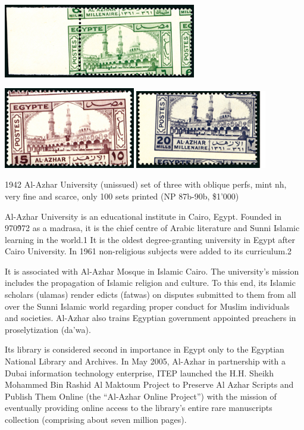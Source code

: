 \documentclass[justified]{tufte-book}
\begin{document}
\bigskip
\begin{center}
\includegraphics[width=0.63\textwidth]{./graphics/EG/al-azhar-6mils-oblique} 
\medskip

\includegraphics[width=0.43\textwidth]{./graphics/EG/al-azhar-15mils-oblique} \includegraphics[width=0.43\textwidth]{./graphics/EG/al-azhar-20mills-oblique} 
\end{center}

1942 Al-Azhar University (unissued) set of three with oblique perfs, mint nh, very fine and scarce, only 100 sets printed (NP 87b-90b, \$1'000)

Al-Azhar University is an educational institute in Cairo, Egypt. Founded in 970\~972 as a madrasa, it is the chief centre of Arabic literature and Sunni Islamic learning in the world.1 It is the oldest degree-granting university in Egypt after Cairo University. In 1961 non-religious subjects were added to its curriculum.2

It is associated with Al-Azhar Mosque in Islamic Cairo. The university's mission includes the propagation of Islamic religion and culture. To this end, its Islamic scholars (ulamas) render edicts (fatwas) on disputes submitted to them from all over the Sunni Islamic world regarding proper conduct for Muslim individuals and societies. Al-Azhar also trains Egyptian government appointed preachers in proselytization (da'wa).

Its library is considered second in importance in Egypt only to the Egyptian National Library and Archives. In May 2005, Al-Azhar in partnership with a Dubai information technology enterprise, ITEP launched the H.H. Sheikh Mohammed Bin Rashid Al Maktoum Project to Preserve Al Azhar Scripts and Publish Them Online (the ``Al-Azhar Online Project'') with the mission of eventually providing online access to the library's entire rare manuscripts collection (comprising about seven million pages).
\end{document}
